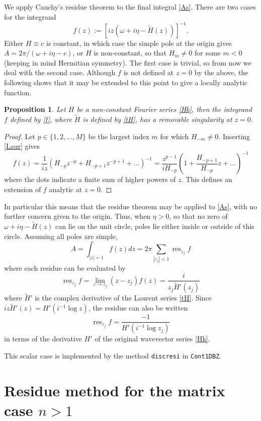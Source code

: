 \documentclass[11pt]{article}
\newcommand{\be}{\begin{equation}}
\newcommand{\ee}{\end{equation}}
\DeclareMathOperator{\res}{res}
\newtheorem{pro}[thm]{Proposition}
\newcommand{\om}{\omega}
\newcommand{\tH}{\tilde H}
\begin{document}
We apply Cauchy's residue theorem to the final integral \eqref{As}.
There are two cases for
the integrand
\be
f(z) := [iz(\om+ i\eta - \tH(z))]^{-1}.
\label{f}
\ee
Either $H\equiv c$ is constant, in which case the simple pole at the
origin gives
$A = 2\pi / (\om+i\eta-c)$, or $H$ is non-constant, so that
$H_m\neq 0$ for some $m<0$ (keeping in mind Hermitian symmetry).
The first case is trivial, so from now we deal with the second case.
Although $f$ is not defined at $z=0$ by the above, the following shows that
it may be extended to this point to give a locally analytic function.
\begin{pro}
  Let $H$ be a non-constant Fourier series \eqref{Hk}, then
  the integrand $f$ defined by \eqref{f}, where $\tH$ is defined by
  \eqref{tH}, has a removable singularity at $z=0$.
\end{pro}
\begin{proof}
  Let $p \in \{1,2, \dots, M\}$
  be the largest index $m$ for which $H_{-m} \neq 0$.
  Inserting \eqref{Laur} gives
  $$
  f(z) = \frac{1}{iz}\left( H_{-p}z^{-p} + H_{-p+1}z^{-p+1} + \dots \right)^{-1}
  =
  \frac{z^{p-1}}{iH_{-p}}\left( 1 + \frac{H_{-p+1}}{H_{-p}}z + \dots \right)^{-1}
  $$
  where the dots indicate a finite sum of higher powers of $z$.
  This defines an extension of $f$ analytic at $z=0$.
\end{proof}
In particular this means that the residue theorem may be applied to
\eqref{As}, with no further concern given to the origin.
Thus, when $\eta>0$, so that no zero of $\om + i\eta - \tH(z)$ can lie
on the unit circle, poles lie either inside or outside of this circle.
Assuming all poles are simple,
\be
A = \int_{|z|=1} f(z) dz = 2\pi \sum_{|z_j|<1} \res_{z_j} f
\ee
where each residue can be evaluated by
\be
\res_{z_j} f = \lim_{z\to z_j} (z-z_j)f(z) = \frac{i}{z_j \tH'(z_j)}
\label{res}
\ee
where $\tH'$ is the complex derivative of the Laurent series \eqref{tH}.
Since $iz\tH'(z) = H'(i^{-1}\log z)$, the residue can
also be written
\be
\res_{z_j} f  = \frac{-1}{H'(i^{-1}\log z_j)}
\ee
in terms of the derivative $H'$ of the original wavevector series \eqref{Hk}.

This scalar case is implemented by the method \texttt{discresi} in
\texttt{Cont1DBZ}.


\section{Residue method for the matrix case $n>1$}









\end{document}
